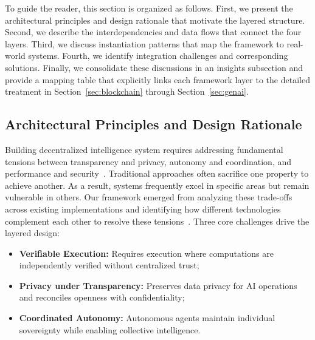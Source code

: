 \documentclass[5p,twocolumn]{elsarticle}
\begin{document}
To guide the reader, this section is organized as follows. First, we present the architectural principles and design rationale that motivate the layered structure. Second, we describe the interdependencies and data flows that connect the four layers. Third, we discuss instantiation patterns that map the framework to real-world systems. Fourth, we identify integration challenges and corresponding solutions. Finally, we consolidate these discussions in an insights subsection and provide a mapping table that explicitly links each framework layer to the detailed treatment in Section~\ref{sec:blockchain} through Section~\ref{sec:genai}.

\subsection{Architectural Principles and Design Rationale}
Building decentralized intelligence system requires addressing fundamental tensions between transparency and privacy, autonomy and coordination, and performance and security~\cite{cao2022decentralized}. Traditional approaches often sacrifice one property to achieve another. As a result, systems frequently excel in specific areas but remain vulnerable in others. Our framework emerged from analyzing these trade-offs across existing implementations and identifying how different technologies complement each other to resolve these tensions~\cite{yu2024toward,zeydan2025decentralizing}. Three core challenges drive the layered design:
\begin{itemize}
    \item \textbf{Verifiable Execution:} Requires execution where computations are independently verified without centralized trust;
    \item \textbf{Privacy under Transparency:} Preserves data privacy for AI operations and reconciles openness with confidentiality;
    \item \textbf{Coordinated Autonomy:} Autonomous agents maintain individual sovereignty while enabling collective intelligence.
\end{itemize}
\end{document}
